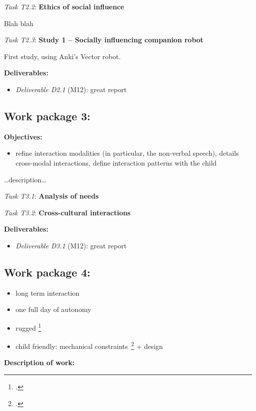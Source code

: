 \documentclass[11pt,a4paper]{report}
\newcommand{\task}[2]{\vspace{0.5cm}\noindent\emph{Task T#1}: {\bf #2}\par}
\newcommand{\D}[3]{\emph{Deliverable D#1} (M#2): #3\\}
\begin{document}
\task{2.2}{Ethics of social influence}
Blah blah

\task{2.3}{Study 1 -- Socially influencing companion robot}
First study, using Anki's Vector robot.

\vspace{0.5cm}\textbf{Deliverables:}

\begin{itemize}
    \item \D{2.1}{12}{great report}
\end{itemize}

\subsection{Work package 3: \wpThree}

\textbf{Objectives:}

\begin{itemize}
    \item refine interaction modalities (in
    particular, the non-verbal speech), details cross-modal interactions,
    define interaction patterns with the child
\end{itemize}

\ldots{}description\ldots{}

\task{3.1}{Analysis of needs}
\task{3.2}{Cross-cultural interactions}

\vspace{0.5cm}\textbf{Deliverables:}

\begin{itemize}
    \item \D{3.1}{12}{great report}
\end{itemize}

\subsection{Work package 4: \wpFour}


\begin{itemize}
    \item long term interaction
    \item one full day of autonomy
    \item rugged \footcite{ozgur2017cellulo, hostettler2016realtime}
    \item child friendly: mechanical constraints~\footcite{ozgur2016permanent} + design
\end{itemize}


\textbf{Description of work:}
\end{document}
